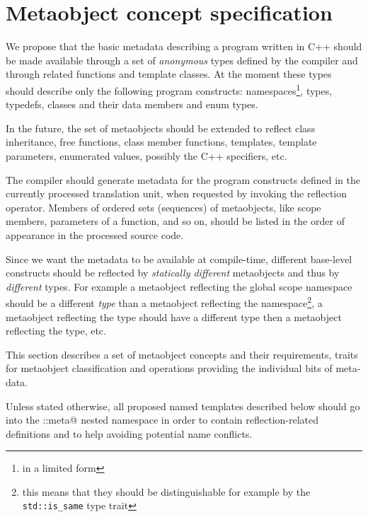 \section{Metaobject concept specification}
\label{section-current-Concepts}

We propose that the basic metadata describing a program written
in C++ should be made available through a set of {\em anonymous} types
defined by the compiler and through related functions and template classes.
At the moment these types should describe only the following program
constructs: namespaces\footnote{in a limited form}, types, typedefs,
classes and their data members and enum types.

In the future, the set of metaobjects should be extended to reflect
class inheritance, free functions, class member functions, templates,
template parameters, enumerated values, possibly the C++ specifiers, etc.

The compiler should generate metadata for the program constructs defined
in the currently processed translation unit, when requested by invoking
the reflection operator. Members of ordered sets (sequences) of metaobjects,
like scope members, parameters of a function, and so on, should be listed
in the order of appearance in the processed source code.

Since we want the metadata to be available at compile-time,
different base-level constructs should be reflected by
{\em statically different} metaobjects and thus by {\em different} types.
For example a metaobject reflecting the global scope namespace should
be a different {\em type} than a metaobject reflecting the \verb@std@
namespace\footnote{this means that they should be distinguishable for
example by the \texttt{std::is\_same} type trait},
a metaobject reflecting the \verb@int@ type should
have a different type then a metaobject reflecting the \verb@double@
type, etc.

This section describes a set of metaobject concepts and their requirements,
traits for metaobject classification and operations providing the individual
bits of meta-data.

Unless stated otherwise, all proposed named templates described below should
go into the \verb@std::meta@ nested namespace in order to contain reflection-related
definitions and to help avoiding potential name conflicts.

























